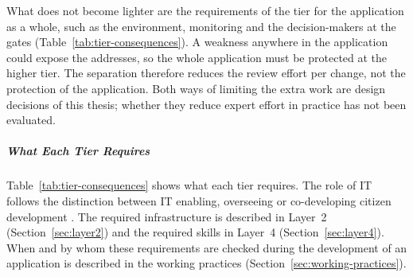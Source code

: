 \documentclass[10pt,a4paper]{article}
\begin{document}
What does not become lighter are the requirements of the tier for the
application as a whole, such as the environment, monitoring and the
decision-makers at the gates (Table~\ref{tab:tier-consequences}). A
weakness anywhere in the application could expose the addresses, so the
whole application must be protected at the higher tier. The separation
therefore reduces the review effort per change, not the protection of
the application. Both ways of limiting the extra work are design
decisions of this thesis; whether they reduce expert effort in practice
has not been evaluated.

\subparagraph{What Each Tier Requires}
Table~\ref{tab:tier-consequences} shows what each tier requires. The
role of IT follows the distinction between IT enabling, overseeing or
co-developing citizen development \parencite{viljoen2024}. The required
infrastructure is described in Layer~2 (Section~\ref{sec:layer2}) and
the required skills in Layer~4 (Section~\ref{sec:layer4}). When and by
whom these requirements are checked during the development of an
application is described in the working practices
(Section~\ref{sec:working-practices}).
\end{document}

